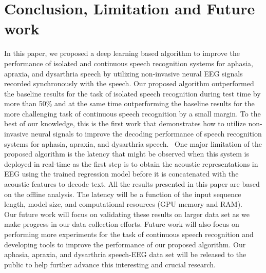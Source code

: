 \documentclass[letterpaper, 10 pt, conference]{ieeeconf}  %
\begin{document}

\section{Conclusion, Limitation and Future work}
In this paper, we proposed a deep learning based algorithm to improve the performance of isolated and continuous speech recognition systems for aphasia, apraxia, and dysarthria speech by utilizing non-invasive neural EEG signals recorded synchronously with the speech. Our proposed algorithm outperformed the baseline results for the task of isolated speech recognition during test time by more than 50\% and at the same time outperforming the baseline results for the more challenging task of continuous speech recognition by a small margin. To the best of our knowledge, this is the first work that demonstrates how to utilize non-invasive neural signals to improve the decoding performance of speech recognition systems for aphasia, apraxia, and dysarthria speech. 
One major limitation of the proposed algorithm is the latency that might be observed when this system is deployed in real-time as the first step is to obtain the acoustic representations in EEG using the trained regression model before it is concatenated with the acoustic features to decode text. All the results presented in this paper are based on the offline analysis. The latency will be a function of the input sequence length, model size, and computational resources (GPU memory and RAM).  
Our future work will focus on validating these results on larger data set as we make progress in our data collection efforts. Future work will also focus on performing more experiments for the task of continuous speech recognition and developing tools to improve the performance of our proposed algorithm. Our aphasia, apraxia, and dysarthria speech-EEG data set will be released to the public to help further advance this interesting and crucial research.  


\end{document}
